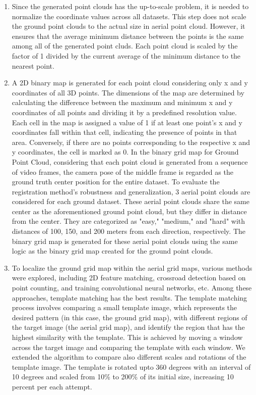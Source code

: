 \documentclass[11pt]{article}
\begin{document}
\begin{enumerate}
        \item Since the generated point clouds has the up-to-scale problem, it is needed to normalize the
        coordinate values across all datasets. This step does not scale the ground point clouds to the actual size
        in aerial point cloud. However, it ensures that the average minimum distance between the points is the same
        among all of the generated point cluds.
        Each point cloud is scaled by the factor of 1 divided by the current average of the minimum distance to the nearest point.

        \item A 2D binary map is generated for each point cloud considering only x and y coordinates of all 3D points.
        The dimensions of the map are determined by calculating the difference between the maximum and minimum x and y
        coordinates of all points and dividing it by a predefined resolution value. Each cell in the map is assigned
        a value of 1 if at least one point's x and y coordinates fall within that cell, indicating the presence of
        points in that area. Conversely, if there are no points corresponding to the respective x and y coordinates,
        the cell is marked as 0. In the binary grid map for Ground Point Cloud, considering that each point cloud is
        generated from a sequence of video frames, the camera pose of the middle frame is regarded as the ground truth
        center position for the entire dataset. To evaluate the registration method's robustness and generalization,
        3 aerial point clouds are considered for each ground dataset. These aerial point clouds share the same center
        as the aforementioned ground point cloud, but they differ in distance from the center. They are categorized
        as "easy," "medium," and "hard" with distances of 100, 150, and 200 meters from each direction, respectively.
        The binary grid map is generated for these aerial point clouds using the same logic as the binary grid map
        created for the ground point clouds.

        \item To localize the ground grid map within the aerial grid maps, various methods were explored, including
        2D feature matching, crossroad detection based on point counting, and training convolutional neural networks,
        etc. Among these approaches, template matching has the best results. The template matching process involves
        comparing a small template image, which represents the desired pattern (in this case, the ground grid map),
        with different regions of the target image (the aerial grid map), and identify the region that has the highest
        similarity with the template. This is achieved by moving a window across the target
        image and comparing the template with each window. We extended the algorithm to compare also different
        scales and rotations of the template image. The template is rotated upto 360 degrees with an interval of 10 degrees and
        scaled from 10\% to 200\% of its initial size, increasing 10 percent per each attempt.

    \end{enumerate}
\end{document}
